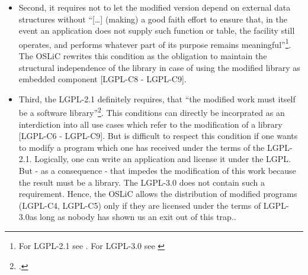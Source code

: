 \begin{itemize}
\begin{itemize}
    \item Second, it requires not to let the modified version depend on external
    data structures without \enquote{[\ldots] (making) a good faith effort to
    ensure that, in the event an application does not supply such function or
    table, the facility still operates, and performs whatever part of its
    purpose remains meaningful}\footnote{For LGPL-2.1 see \cite[cf.][\nopage
    wp.\ §2d]{Lgpl21OsiLicense1999a}. For LGPL-3.0 see \cite[cf.][\nopage wp.\
    §2a]{Lgpl30OsiLicense2007a}}. The OSLiC rewrites this condition as the
    obligation to maintain the structural independence of the library in case of
    using the modified library as embedded component [LGPL-C8 - LGPL-C9].
    
    \item \label{para:libislib}Third, the LGPL-2.1 definitely requires, that
    \enquote{the modified work must itself be a software
    library}\footcite[cf.][\nopage wp.\ §2]{Lgpl21OsiLicense1999a}. This
    conditions can directly be incorprated as an interdiction into all use cases
    which refer to the modification of a library [LGPL-C6 - LGPL-C9]. But is
    difficult to respect this condition if one wants to modify a program which
    one has received under the terms of the LGPL-2.1. Logically, one can write
    an application and license it under the LGPL. But - as a consequence - that
    impedes the modification of this work because the result must be a library.
    The LGPL-3.0 does not contain such a requirement. Hence, the OSLiC allows
    the distribution of modified programs (LGPL-C4, LGPL-C5) only if they are
    licensed under the terms of LGPL-3.0{as long as nobody has shown us an exit
    out of this trap.}.
  \end{itemize}
  

\end{itemize}
